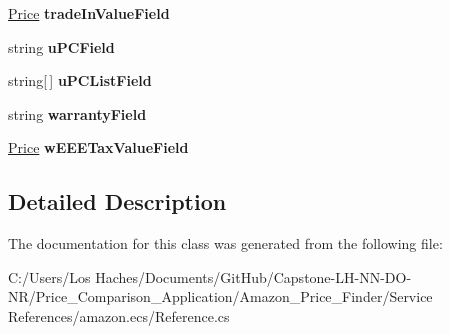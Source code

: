 \begin{DoxyCompactItemize}
\item 
\hypertarget{class_price___comparison_1_1amazon_1_1ecs_1_1_item_attributes_a067cd18168743aeed0542a059d32485b}{\hyperlink{class_price___comparison_1_1amazon_1_1ecs_1_1_price}{Price} {\bfseries trade\-In\-Value\-Field}}\label{class_price___comparison_1_1amazon_1_1ecs_1_1_item_attributes_a067cd18168743aeed0542a059d32485b}

\item 
\hypertarget{class_price___comparison_1_1amazon_1_1ecs_1_1_item_attributes_a4317e9edd1bb231e0ab02fe8eab09ace}{string {\bfseries u\-P\-C\-Field}}\label{class_price___comparison_1_1amazon_1_1ecs_1_1_item_attributes_a4317e9edd1bb231e0ab02fe8eab09ace}

\item 
\hypertarget{class_price___comparison_1_1amazon_1_1ecs_1_1_item_attributes_af4c652ad69aab5178af98dea1c1f370b}{string\mbox{[}$\,$\mbox{]} {\bfseries u\-P\-C\-List\-Field}}\label{class_price___comparison_1_1amazon_1_1ecs_1_1_item_attributes_af4c652ad69aab5178af98dea1c1f370b}

\item 
\hypertarget{class_price___comparison_1_1amazon_1_1ecs_1_1_item_attributes_a99276e29de576a658ba4ecbac746b7ba}{string {\bfseries warranty\-Field}}\label{class_price___comparison_1_1amazon_1_1ecs_1_1_item_attributes_a99276e29de576a658ba4ecbac746b7ba}

\item 
\hypertarget{class_price___comparison_1_1amazon_1_1ecs_1_1_item_attributes_a85820fb1f9a3140f5fb57af7c6abfaa0}{\hyperlink{class_price___comparison_1_1amazon_1_1ecs_1_1_price}{Price} {\bfseries w\-E\-E\-E\-Tax\-Value\-Field}}\label{class_price___comparison_1_1amazon_1_1ecs_1_1_item_attributes_a85820fb1f9a3140f5fb57af7c6abfaa0}

\end{DoxyCompactItemize}


\subsection{Detailed Description}


The documentation for this class was generated from the following file\-:\begin{DoxyCompactItemize}
\item 
C\-:/\-Users/\-Los Haches/\-Documents/\-Git\-Hub/\-Capstone-\/\-L\-H-\/\-N\-N-\/\-D\-O-\/\-N\-R/\-Price\-\_\-\-Comparison\-\_\-\-Application/\-Amazon\-\_\-\-Price\-\_\-\-Finder/\-Service References/amazon.\-ecs/Reference.\-cs\end{DoxyCompactItemize}
